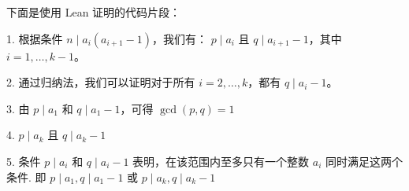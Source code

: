 \documentclass[a4paper]{article}
\begin{document}
    下面是使用 Lean 证明的代码片段：

    1. 根据条件 $n \mid a_i(a_{i+1}-1)$，我们有：
    $p \mid a_i$ 且 $q \mid a_{i+1}-1$，其中 $i = 1, \ldots, k-1$。

    2. 通过归纳法，我们可以证明对于所有 $i = 2, \ldots, k$，都有 $q \mid a_i-1$。

    3. 由 $p \mid a_1$ 和 $q \mid a_1-1$，可得 $\gcd(p, q) = 1$

    4. $p \mid a_k$ 且 $q \mid a_k-1$

    5. 条件 $p \mid a_i$ 和 $q \mid a_i-1$ 表明，在该范围内至多只有一个整数 $a_i$ 同时满足这两个条件.
    即 $p \mid a_1, q \mid a_1-1$ 或 $p \mid a_k, q \mid a_k-1$



    
\end{document}
